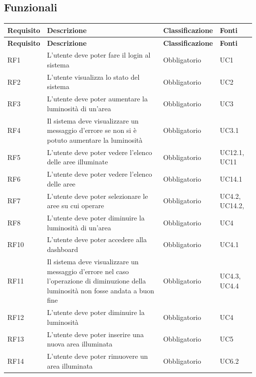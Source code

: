 \documentclass[12pt]{article}
\begin{document}
\subsection{Funzionali}
 \begin{tabularx}{\linewidth}{|>{\hsize=0.6\hsize}X|>{\hsize=1.8\hsize}X|>{\hsize=1\hsize}X|>{\hsize=0.6\hsize}X|}
\hline
\textbf{Requisito} & \textbf{Descrizione} & \textbf{Classificazione} & \textbf{Fonti} \\
\hline
\endfirsthead
\hline
\textbf{Requisito} & \textbf{Descrizione} & \textbf{Classificazione} & \textbf{Fonti} \\
\hline
\endhead
\hline
\endfoot
RF1	 & L'utente deve poter fare il login al sistema	 & Obbligatorio & UC1 \\
\hline				
RF2	 & L'utente visualizza lo stato del sistema	 & Obbligatorio & UC2 \\
\hline				
RF3	 & L'utente deve poter aumentare la luminosità di un'area & Obbligatorio & UC3 \\
\hline				
RF4	 & Il sistema deve visualizzare un messaggio d'errore se non si è potuto aumentare la luminosità & Obbligatorio	& UC3.1 \\
\hline	
RF5 & L'utente deve poter vedere l'elenco delle aree illuminate	 & Obbligatorio & UC12.1, UC11 \\
\hline
RF6 & L'utente deve poter vedere l'elenco delle aree & Obbligatorio & UC14.1 \\
\hline
RF7	 & L'utente deve poter selezionare le aree su cui operare & Obbligatorio & UC4.2, UC14.2,  \\
\hline	
RF8	 & L'utente deve poter diminuire la luminosità di un'area & Obbligatorio & UC4 \\
\hline				
RF10	 & L'utente deve poter accedere alla dashboard & Obbligatorio & UC4.1 \\
\hline										
RF11	 & Il sistema deve visualizzare un messaggio d'errore nel caso l'operazione di diminuzione della luminosità non fosse andata a buon fine & Obbligatorio & UC4.3, UC4.4 \\
\hline				
RF12	 & L'utente deve poter diminuire la luminosità & Obbligatorio & UC4 \\
\hline				
RF13	 & L'utente deve poter inserire una nuova area illuminata & Obbligatorio & UC5 \\
\hline				
RF14	 & L'utente deve poter rimuovere un area illuminata & Obbligatorio & UC6.2 \\

\end{tabularx}
\end{document}

